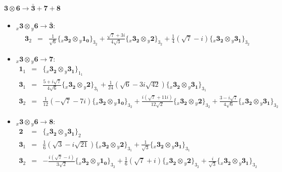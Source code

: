 \documentclass[english]{article}
\newcommand{\rep}[1]{\mathbf{#1}}
\newcommand{\repx}[2]{{}_{#2}\mathbf{#1}}
\newcommand{\subcg}[3]{\big\{ \repx{#1}{x}\otimes\repx{#2}{y}\big\}^{}_{#3}}
\begin{document}
\paragraph*{\Large $\rep{3}\otimes\rep{6}\to\rep{\bar{3}}+\rep{7}+\rep{8}$}
\begin{itemize}
\item $\repx{3}{x}\otimes\repx{6}{y}\to\rep{\bar{3}}$:
\begin{eqnarray*}
\rep{3}_{2} &=& \frac{1}{\sqrt{6}}\subcg{3_{2}}{1_{0}}{3_{2}}+\frac{\sqrt{7}+3 i}{4 \sqrt{3}}\subcg{3_{2}}{2}{3_{2}}+\frac{1}{4} \left(\sqrt{7}-i\right)\subcg{3_{2}}{3_{1}}{3_{2}}
\end{eqnarray*}
\item $\repx{3}{x}\otimes\repx{6}{y}\to\rep{7}$:
\begin{eqnarray*}
\rep{1}_{1} &=& \subcg{3_{2}}{3_{1}}{1_{1}}
\\
\rep{3}_{1} &=& \frac{5+i \sqrt{7}}{4 \sqrt{6}}\subcg{3_{2}}{2}{3_{1}}+\frac{1}{24} \left(\sqrt{6}-3 i \sqrt{42}\right)\subcg{3_{2}}{3_{1}}{3_{1}}
\\
\rep{3}_{2} &=& \frac{1}{12} \left(-\sqrt{7}-7 i\right)\subcg{3_{2}}{1_{0}}{3_{2}}+\frac{i \left(\sqrt{7}+11 i\right)}{12 \sqrt{2}}\subcg{3_{2}}{2}{3_{2}}+\frac{3-i \sqrt{7}}{4 \sqrt{6}}\subcg{3_{2}}{3_{1}}{3_{2}}
\end{eqnarray*}
\item $\repx{3}{x}\otimes\repx{6}{y}\to\rep{8}$:
\begin{eqnarray*}
\rep{2} &=& \subcg{3_{2}}{3_{1}}{2}
\\
\rep{3}_{1} &=& \frac{1}{6} \left(\sqrt{3}-i \sqrt{21}\right)\subcg{3_{2}}{2}{3_{1}}+\frac{1}{\sqrt{3}}\subcg{3_{2}}{3_{1}}{3_{1}}
\\
\rep{3}_{2} &=& -\frac{i \left(\sqrt{7}-i\right)}{3 \sqrt{2}}\subcg{3_{2}}{1_{0}}{3_{2}}+\frac{1}{6} \left(\sqrt{7}+i\right)\subcg{3_{2}}{2}{3_{2}}+\frac{i}{\sqrt{3}}\subcg{3_{2}}{3_{1}}{3_{2}}
\end{eqnarray*}
\end{itemize}
\end{document}
